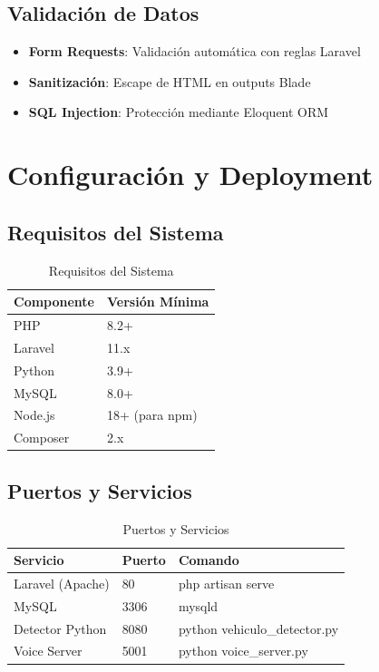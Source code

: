 \subsection{Validación de Datos}

\begin{itemize}
    \item \textbf{Form Requests}: Validación automática con reglas Laravel
    \item \textbf{Sanitización}: Escape de HTML en outputs Blade
    \item \textbf{SQL Injection}: Protección mediante Eloquent ORM
\end{itemize}

\newpage

\section{Configuración y Deployment}

\subsection{Requisitos del Sistema}

\begin{table}[H]
\centering
\begin{tabular}{|l|l|}
\hline
\textbf{Componente} & \textbf{Versión Mínima} \\
\hline
PHP & 8.2+ \\
Laravel & 11.x \\
Python & 3.9+ \\
MySQL & 8.0+ \\
Node.js & 18+ (para npm) \\
Composer & 2.x \\
\hline
\end{tabular}
\caption{Requisitos del Sistema}
\end{table}

\subsection{Puertos y Servicios}

\begin{table}[H]
\centering
\begin{tabular}{|l|l|l|}
\hline
\textbf{Servicio} & \textbf{Puerto} & \textbf{Comando} \\
\hline
Laravel (Apache) & 80 & php artisan serve \\
MySQL & 3306 & mysqld \\
Detector Python & 8080 & python vehiculo\_detector.py \\
Voice Server & 5001 & python voice\_server.py \\
\hline
\end{tabular}
\caption{Puertos y Servicios}
\end{table}

